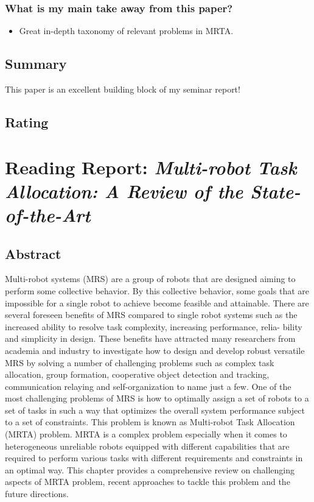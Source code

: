 \documentclass{article}
\begin{document}
\subsubsection*{What is my main take away from this paper?}
\begin{itemize}
    \item Great in-depth taxonomy of relevant problems in MRTA.
\end{itemize}

\subsection*{Summary}
This paper is an excellent building block of my seminar report!
\subsection*{Rating}

\section{Reading Report: \emph{Multi-robot Task Allocation: A Review of the State-of-the-Art}}
\cite{Khamis2015}

\subsection*{Abstract}
Multi-robot systems (MRS) are a group of robots that are designed
aiming to perform some collective behavior. By this collective behavior, some goals
that are impossible for a single robot to achieve become feasible and attainable.
There are several foreseen benefits of MRS compared to single robot systems such
as the increased ability to resolve task complexity, increasing performance, relia-
bility and simplicity in design. These benefits have attracted many researchers from
academia and industry to investigate how to design and develop robust versatile MRS
by solving a number of challenging problems such as complex task allocation, group
formation, cooperative object detection and tracking, communication relaying and
self-organization to name just a few. One of the most challenging problems of MRS
is how to optimally assign a set of robots to a set of tasks in such a way that optimizes
the overall system performance subject to a set of constraints. This problem is known
as Multi-robot Task Allocation (MRTA) problem. MRTA is a complex problem
especially when it comes to heterogeneous unreliable robots equipped with different
capabilities that are required to perform various tasks with different requirements
and constraints in an optimal way. This chapter provides a comprehensive review on
challenging aspects of MRTA problem, recent approaches to tackle this problem and
the future directions.
\end{document}
